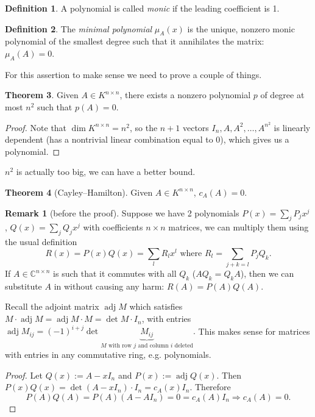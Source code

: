 \documentclass[a4paper]{article}
\newcommand{\adj}{\operatorname{adj}}
\theoremstyle{definition}
\newtheorem{defn}{Definition}[subsection]
\newtheorem{thm}[defn]{Theorem}
\newtheorem*{remark}{Remark}
\begin{document}
\begin{defn}
	A polynomial is called \textit{monic} if the leading coefficient is 1.
\end{defn}

\begin{defn}
The \textit{minimal polynomial} $\mu_{A}(x)$ is the unique, nonzero monic polynomial of the smallest degree such that it annihilates the matrix: $\mu_{A}(A)=0$.
\end{defn}

For this assertion to make sense we need to prove a couple of things.

\begin{thm}
	Given $A \in K^{n\times n}$, there exists a nonzero polynomial $p$ of degree at most $n^2$ such that $p(A)=0$.
\end{thm}

\begin{proof}
	Note that $\dim K^{n\times n}=n^2$, so the $n+1$ vectors $I_n, A, A^2, \ldots , A^{n^2}$ is linearly dependent (has a nontrivial linear combination equal to 0), which gives us a polynomial.
\end{proof}

$n^2$ is actually too big, we can have a better bound.

\begin{thm} [Cayley--Hamilton]
	Given $A \in K^{n\times n}$, $c_{A}(A)=0$.
\end{thm}

\begin{remark} [before the proof]
	Suppose we have 2 polynomials $P(x)=\sum_j P_j x^j$, $Q(x)=\sum_j Q_j x^j$ with coefficients $n \times n$ matrices, we can multiply them using the usual definition
\[
R(x) = P(x)Q(x)=\sum_l R_l x^l \text{ where } R_l=\sum_{j+k=l} P_j Q_k .
\]
If $A \in \mathbb C^{n\times n}$ is such that it commutes with all $Q_k$ ($A Q_k = Q_k A$), then we can substitute $A$ in without causing any harm: $R(A)=P(A)Q(A) .$

	Recall the adjoint matrix $\adj M$ which satisfies $M \cdot \adj M = \adj M \cdot M = \det M \cdot I_n$, with entries $\adj M_{ij}=(-1)^{i+j} \det \underbrace{M_{ij}}_{M\text{ with row }j\text{ and column }i\text{ deleted}} .$ This makes sense for matrices with entries in any commutative ring, e.g. polynomials.
\end{remark}

\begin{proof}
Let $Q(x):=A - x I_n$ and $P(x):= \adj Q(x)$. Then $P(x)Q(x)=\det (A-xI_n) \cdot I_n=c_{A}(x)I_n$. Therefore
\[
P(A)Q(A)=P(A)(A-A I_n)=0=c_{A}(A)I_n \Rightarrow c_{A}(A)=0 .
\]
\end{proof}
\end{document}
